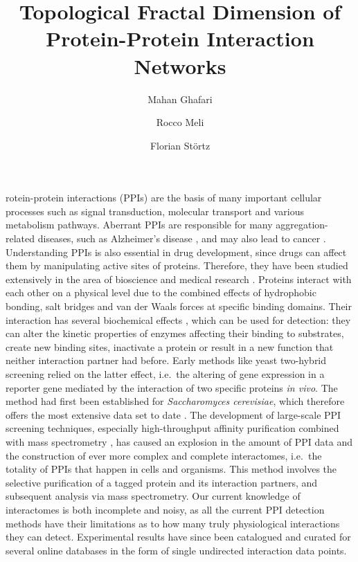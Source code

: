 \documentclass[9pt,onecolumn,twoside]{pnas-new}
\title{Topological Fractal Dimension of Protein-Protein Interaction Networks}
\author[]{Mahan Ghafari}
\author[]{Rocco Meli}
\author[]{Florian Störtz}
\affil[]{Interdisciplinary Bioscience DTP, Rex Richards Building, University of Oxford, Oxford OX1 3RQ}
\begin{document}
\verticaladjustment{-2pt}

\maketitle
\thispagestyle{firststyle}

rotein-protein interactions (PPIs) are the basis of many important cellular processes such as signal transduction, molecular transport and various metabolism pathways. 
Aberrant PPIs are responsible for many aggregation-related diseases, such as Alzheimer's disease \cite{kramer2012}, and may also lead to cancer \cite{liu2011}. Understanding PPIs is also essential in drug development, since drugs can affect them by manipulating active sites of proteins. 
Therefore, they have been studied extensively in the area of bioscience and medical research \cite{oti2006, ivanov2013, laraia2015}. 
Proteins interact with each other on a physical level due to the combined effects of hydrophobic bonding, salt bridges and van der Waals forces at specific binding domains. Their interaction has several biochemical effects \cite{phiz1995,srinivasa2014}, which can be used for detection: they can alter the kinetic properties of enzymes affecting their binding to substrates, create new binding sites, inactivate a protein or result in a new function that neither interaction partner had before.
Early methods like yeast two-hybrid screening \cite{fields1989} relied on the latter effect, i.e.\ the altering of gene expression in a reporter gene mediated by the interaction of two specific proteins \emph{in vivo}. The method had first been established for \emph{Saccharomyces cerevisiae}, which therefore offers the most extensive data set to date \cite{biogrid2017}.
The development of large-scale PPI screening techniques, especially high-throughput affinity purification combined with mass spectrometry \cite{yates2009}, 
has caused an explosion in the amount of PPI data and the construction of ever more complex and complete interactomes, i.e.\ the totality of PPIs that happen in cells and organisms. This method involves the selective purification of a tagged protein and its interaction partners, and subsequent analysis via mass spectrometry.
Our current knowledge of interactomes is both incomplete and noisy, as all the current PPI detection methods have their limitations as to how many truly physiological interactions they can detect. Experimental results have since been catalogued and curated for several online databases \cite{pedamallu2014, biogrid2017} in the form of single undirected interaction data points.
\end{document}
